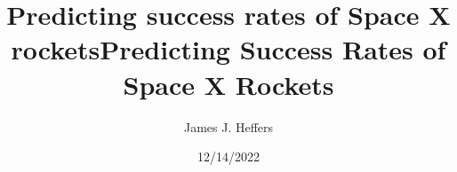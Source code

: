 \documentclass{beamer}
\title[University of Michigan - Ann Arbor]{Predicting success rates of Space X rockets} %
\title[Predicting Success Rates of Space X Rockets]{Predicting Success Rates of Space X Rockets} %
\author{James J. Heffers} %
\institute[U(M)]
{
University of Michigan - Ann Arbor\\ %
\medskip
\textit{heffers@umich.edu} %
}
\date{12/14/2022} %
\begin{document}
\begin{frame}
\titlepage %
\end{frame}





















\end{document}
